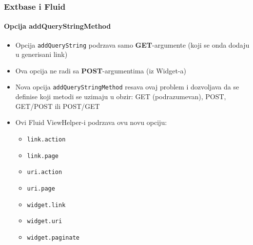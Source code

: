 \begin{frame}[fragile]
	\frametitle{Extbase i Fluid}
	\framesubtitle{Opcija addQueryStringMethod}

	\begin{itemize}
		\item Opcija \texttt{addQueryString} podrzava samo \textbf{GET}-argumente \newline
			\small(koji se onda dodaju u generisani link)\normalsize
		\item Ova opcija ne radi sa \textbf{POST}-argumentima (iz Widget-a) 
		\item Nova opcija \texttt{addQueryStringMethod} resava ovaj problem i dozvoljava da se definise koji metodi se uzimaju u obzir:\newline
			GET (podrazumevan), POST, GET/POST ili POST/GET
		\item Ovi Fluid ViewHelper-i podrzava ovu novu opciju:

			\begin{itemize}\smaller
				\item \texttt{link.action}
				\item \texttt{link.page}
				\item \texttt{uri.action}
				\item \texttt{uri.page}
				\item \texttt{widget.link}
				\item \texttt{widget.uri}
				\item \texttt{widget.paginate}
			\end{itemize}

	\end{itemize}

\end{frame}


